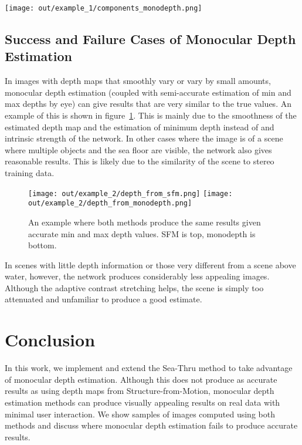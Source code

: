 \documentclass[10pt,twocolumn,letterpaper]{article}
\begin{document}
\begin{figure*}[!t]
\begin{center}
\texttt{[image: out/example\_1/components\_monodepth.png]}\newline
\end{center}
   \caption{\small{From left-to-right, top-to-bottom: input, neighborhood map, backscatter coefficients, illumination map,
   attenuation coefficients, and unprocessed output for a monodepth-processed image.}}
\label{fig:components}
\end{figure*}

\subsection{Success and Failure Cases of Monocular Depth Estimation}
In images with depth maps that smoothly vary or vary by small amounts, monocular depth estimation (coupled with
semi-accurate estimation of min and max depths by eye) can give results that are very similar to the true values.
An example of this is shown in figure~\ref{fig:imgcomparison2}.
This is mainly due to the smoothness of the estimated depth map and the estimation of minimum depth instead of
and intrinsic strength of the network. In other cases where the image is of a scene where multiple objects and
the sea floor are visible, the network also gives reasonable results. This is likely due to the similarity of
the scene to stereo training data.

\begin{figure}[!t]
\begin{center}
\texttt{[image: out/example\_2/depth\_from\_sfm.png]}\newline
\texttt{[image: out/example\_2/depth\_from\_monodepth.png]}
\end{center}
   \caption{\small{An example where both methods produce the same results given accurate min and max depth values.
   SFM is top, monodepth is bottom.}}
\label{fig:imgcomparison2}
\end{figure}

In scenes with little depth information or those very different from a scene above water, however, the network
produces considerably less appealing images. Although the adaptive contrast stretching helps, the scene is
simply too attenuated and unfamiliar to produce a good estimate.

\section{Conclusion}
In this work, we implement and extend the Sea-Thru method to take advantage of monocular depth estimation.
Although this does not produce as accurate results as using depth maps from Structure-from-Motion, monocular
depth estimation methods can produce visually appealing results on real data with minimal user interaction.
We show samples of images computed using both methods and discuss where monocular depth estimation fails to
produce accurate results.
\end{document}

